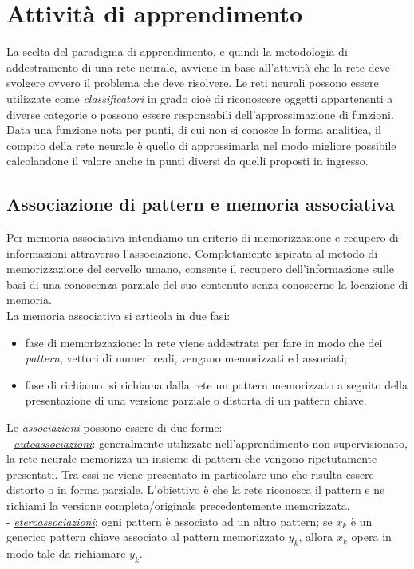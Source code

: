 \documentclass[12pt,a4paper,oneside]{book}
\begin{document}
	
\section{Attività di apprendimento}
		
		La scelta del paradigma di apprendimento, e quindi la metodologia di addestramento di una rete neurale, avviene in base all'attività che la rete deve svolgere ovvero il problema che deve risolvere. Le reti neurali possono essere utilizzate come \emph{classificatori} in grado cioè di riconoscere oggetti appartenenti a diverse categorie o possono essere responsabili dell'approssimazione di funzioni. Data una funzione nota per punti, di cui non si conosce la forma analitica, il compito della rete neurale è quello di approssimarla nel modo migliore possibile calcolandone il valore anche in punti diversi da quelli proposti in ingresso.\\
		
		\subsection{Associazione di pattern e memoria associativa}
		
		Per memoria associativa intendiamo un criterio di memorizzazione e recupero di informazioni attraverso l'associazione. Completamente ispirata al metodo di memorizzazione del cervello umano, consente il recupero dell'informazione sulle basi di una conoscenza parziale del suo contenuto senza conoscerne la locazione di memoria.\\
		La memoria associativa si articola in due fasi:\\
		
		\begin{itemize}
		 \item fase di memorizzazione: la rete viene addestrata per fare in modo che dei \emph{pattern}, vettori di numeri reali, vengano memorizzati ed associati;
		 \item fase di richiamo: si richiama dalla rete un pattern memorizzato a seguito della presentazione di una versione parziale o distorta di un pattern chiave. 
		\end{itemize}
	
		Le \emph{associazioni} possono essere di due forme:\\ 
		- \underline{\emph{autoassociazioni}}: generalmente utilizzate nell'apprendimento non supervisionato, la rete neurale memorizza un insieme di pattern che vengono ripetutamente presentati. Tra essi ne viene presentato in particolare uno che risulta essere distorto o in forma parziale. L'obiettivo è che la rete riconosca il pattern e ne richiami la versione completa/originale precedentemente memorizzata.\\
		-  \underline{\emph{eteroassociazioni}}: ogni pattern è associato ad un altro pattern; se $x_{k}$ è un generico pattern chiave associato al pattern memorizzato $y_{k}$, allora $x_{k}$ opera in modo tale da richiamare $y_{k}$.
		
\end{document}
